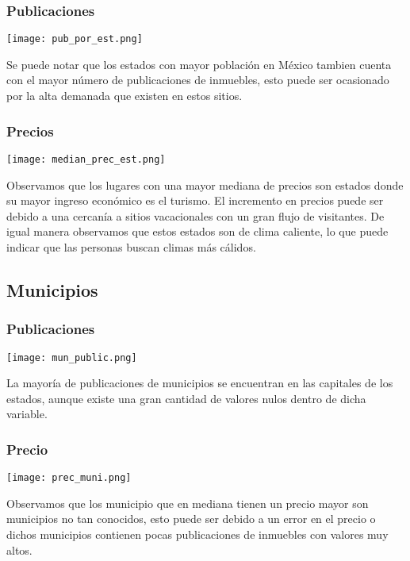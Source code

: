 \documentclass{report}
\begin{document}
            \subsubsection{Publicaciones}
            \begin{center}
            \texttt{[image: pub\_por\_est.png]}
            \end{center}
            Se puede notar que los estados con mayor población en México tambien cuenta con el mayor número de publicaciones de inmuebles, esto puede ser ocasionado por la alta demanada que existen en estos sitios.
            
            \subsubsection{Precios}
            \begin{center}
            \texttt{[image: median\_prec\_est.png]}
            \end{center}
            Observamos que los lugares con una mayor mediana de precios son estados donde su mayor ingreso económico es el turismo. El incremento en precios puede ser debido a una cercanía a sitios vacacionales con un gran flujo de visitantes. De igual manera observamos que estos estados son de clima caliente, lo que puede indicar que las personas buscan climas más cálidos.
            
\subsection{Municipios}
\subsubsection{Publicaciones}
\begin{center}
\texttt{[image: mun\_public.png]}
\end{center}
La mayoría de publicaciones de municipios se encuentran en las capitales de los estados, aunque existe una gran cantidad de valores nulos dentro de dicha variable.

\subsubsection{Precio}
\begin{center}
\texttt{[image: prec\_muni.png]}
\end{center}
Observamos que los municipio que en mediana tienen un precio mayor son municipios no tan conocidos, esto puede ser debido a un error en el precio o dichos municipios contienen pocas publicaciones de inmuebles con valores muy altos.
\end{document}
